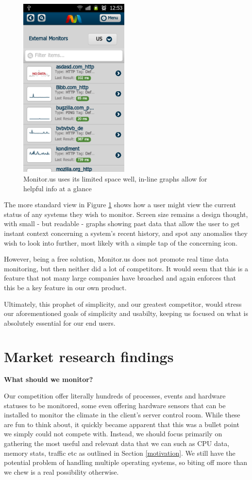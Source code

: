 \documentclass{l3proj}
\begin{document}
\begin{figure}[H]
\centering
\includegraphics[width=55mm]{Competitors/MonitorUS_iPhone2.png}
\caption{Monitor.us uses its limited space well, in-line graphs allow for helpful info at a glance}
\label{fig:MUSiPhone2}
\end{figure}

The more standard view in Figure \ref{fig:MUSiPhone2} shows how a user might view the current status of any systems they wish to monitor. Screen size remains a design thought, with small - but readable - graphs showing past data that allow the user to get instant context concerning a system's recent history, and spot any anomalies they wish to look into further, most likely with a simple tap of the concerning icon.

However, being a free solution, Monitor.us does not promote real time data monitoring, but then neither did a lot of competitors. It would seem that this is a feature that not many large companies have broached and again enforces that this be a key feature in our own product.

Ultimately, this prophet of simplicity, and our greatest competitor, would stress our aforementioned goals of simplicity and usabilty, keeping us focused on what is absolutely essential for our end users.

\section{Market research findings}

\textbf{What should we monitor?}

Our competition offer literally hundreds of processes, events and hardware statuses to be monitored, some even offering hardware sensors that can be installed to monitor the climate in the client’s server control room. While these are fun to think about, it quickly became apparent that this was a bullet point we simply could not compete with. Instead, we should focus primarily on gathering the most useful and relevant data that we can such as CPU data, memory stats, traffic etc as outlined in Section \ref{motivation}. We still have the potential problem of handling multiple operating systems, so biting off more than we chew is a real possibility otherwise.
\end{document}
